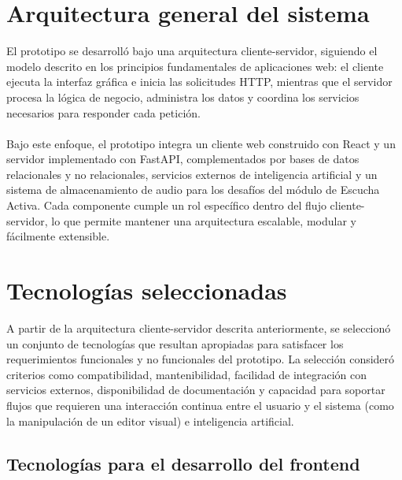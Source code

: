 \section{Arquitectura general del sistema}
El prototipo se desarrolló bajo una arquitectura cliente-servidor, siguiendo el modelo descrito en los principios fundamentales de aplicaciones web: el cliente ejecuta la interfaz gráfica e inicia las solicitudes HTTP, mientras que el servidor procesa la lógica de negocio, administra los datos y coordina los servicios necesarios para responder cada petición.
\\
\\
Bajo este enfoque, el prototipo integra un cliente web construido con React y un servidor implementado con FastAPI, complementados por bases de datos relacionales y no relacionales, servicios externos de inteligencia artificial y un sistema de almacenamiento de audio para los desafíos del módulo de Escucha Activa. Cada componente cumple un rol específico dentro del flujo cliente-servidor, lo que permite mantener una arquitectura escalable, modular y fácilmente extensible.

\section{Tecnologías seleccionadas}
A partir de la arquitectura cliente-servidor descrita anteriormente, se seleccionó un conjunto de tecnologías que resultan apropiadas para satisfacer los requerimientos funcionales y no funcionales del prototipo. La selección consideró criterios como compatibilidad, mantenibilidad, facilidad de integración con servicios externos, disponibilidad de documentación y capacidad para soportar flujos que requieren una interacción continua entre el usuario y el sistema (como la manipulación de un editor visual) e inteligencia artificial.

\subsection{Tecnologías para el desarrollo del frontend}

